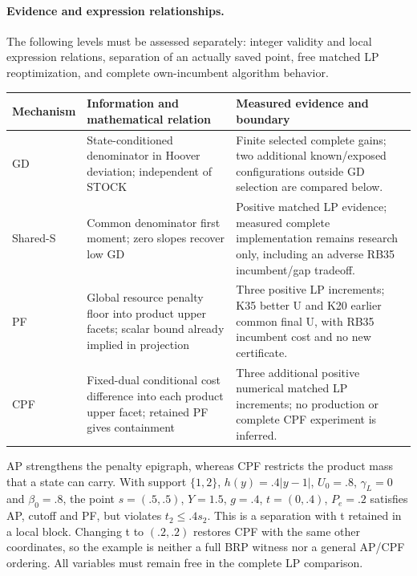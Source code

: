 \paragraph{Evidence and expression relationships.}
The following levels must be assessed separately: integer validity and local
expression relations, separation of an actually saved point, free matched
LP reoptimization, and complete own-incumbent algorithm behavior.
\begin{center}\small
\begin{tabular}{p{.12\linewidth}p{.34\linewidth}p{.42\linewidth}}
Mechanism & Information and mathematical relation & Measured evidence and boundary \\
\hline
GD & State-conditioned denominator in Hoover deviation; independent of STOCK
& Finite selected complete gains; two additional known/exposed configurations
  outside GD selection are compared below. \\
Shared-S & Common denominator first moment; zero slopes recover low GD
& Positive matched LP evidence; measured complete implementation remains
  research only, including an adverse RB35 incumbent/gap tradeoff. \\
PF & Global resource penalty floor into product upper facets; scalar bound
  already implied in projection
& Three positive LP increments; K35 better U and K20 earlier common final U,
  with RB35 incumbent cost and no new certificate. \\
CPF & Fixed-dual conditional cost difference into each product upper facet;
  retained PF gives containment
& Three additional positive numerical matched LP increments; no production
  or complete CPF experiment is inferred. \\
\end{tabular}
\end{center}

AP strengthens the penalty epigraph, whereas CPF restricts the product mass
that a state can carry. With support $\{1,2\}$, $h(y)=.4|y-1|$, $U_0=.8$,
$\gamma_L=0$ and $\beta_0=.8$, the point $s=(.5,.5)$, $Y=1.5$, $g=.4$,
$t=(0,.4)$, $P_e=.2$ satisfies AP, cutoff and PF, but violates
$t_2\le.4s_2$. This is a separation with t retained in a local block.
Changing t to $(.2,.2)$ restores CPF with the same other coordinates, so
the example is neither a full BRP witness nor a general AP/CPF ordering.
All variables must remain free in the complete LP comparison.

